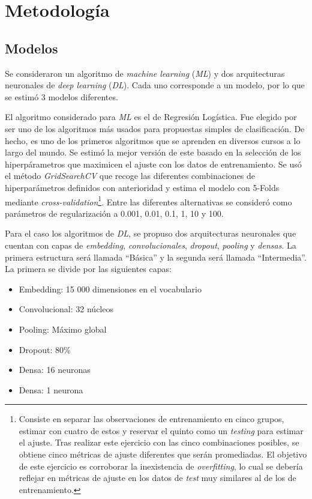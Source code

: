 \section{Metodología}

\subsection{Modelos}
Se consideraron un algoritmo de \textit{machine learning} (\textit{ML}) y dos  arquitecturas neuronales de \textit{deep learning} (\textit{DL}). Cada uno corresponde a un modelo, por lo que se estimó 3 modelos diferentes.

El algoritmo considerado para \textit{ML} es el de Regresión Logística. Fue elegido por ser uno de los algoritmos más usados para propuestas simples de clasificación. De hecho, es uno de los primeros algoritmos que se aprenden en diversos cursos a lo largo del mundo. Se estimó la mejor versión de este basado en la selección de los hiperpárametros que maximicen el ajuste con los datos de entrenamiento. Se usó el método \textit{GridSearchCV} que recoge las diferentes combinaciones de hiperparámetros definidos con anterioridad y estima el modelo con 5-Folds mediante \textit{cross-validation}\footnote{Consiste en separar las observaciones de entrenamiento en cinco grupos, estimar con cuatro de estos y reservar el quinto como un \textit{testing} para estimar el ajuste. Tras realizar este ejercicio con las cinco combinaciones posibles, se obtiene cinco métricas de ajuste diferentes que serán promediadas. El objetivo de este ejercicio es corroborar la inexistencia de \textit{overfitting}, lo cual se debería reflejar en métricas de ajuste en los datos de \textit{test} muy similares al de los de entrenamiento.}. Entre las diferentes alternativas se consideró como parámetros de regularización a 0.001, 0.01, 0.1, 1, 10 y 100.

Para el caso los algoritmos de \textit{DL}, se propuso dos arquitecturas neuronales que cuentan con capas de \textit{embedding}, \textit{convolucionales}, \textit{dropout}, \textit{pooling} y \textit{densas}. La primera estructura será llamada “Básica” y la segunda será llamada “Intermedia”. La primera se divide por las siguientes capas:
\begin{itemize}
	\itemsep0em 
	\item Embedding: 15 000 dimensiones en el vocabulario
	\item Convolucional: 32 núcleos
	\item Pooling: Máximo global
	\item Dropout: 80\%
	\item Densa: 16 neuronas
	\item Densa: 1 neurona
\end{itemize}

